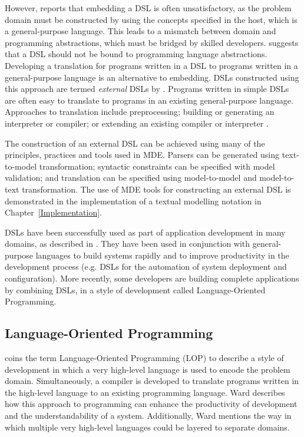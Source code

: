 However, \cite{dmitriev04lop} reports that embedding a DSL is often unsatisfactory, as the problem domain must be constructed by using the concepts specified in the host, which is a general-purpose language. This leads to a mismatch between domain and programming abstractions, which must be bridged by skilled developers. \cite{dmitriev04lop} suggests that a DSL should not be bound to programming language abstractions. Developing a translation for programs written in a DSL to programs written in a general-purpose language is an alternative to embedding. DSLs constructed using this approach are termed \emph{external} DSLs by \cite{fowler10dsls}. Programs written in simple DSLs are often easy to translate to programs in an existing general-purpose language. Approaches to translation include preprocessing; building or generating an interpreter or compiler; or extending an existing compiler or interpreter \cite{dmitriev04lop}.

The construction of an external DSL can be achieved using many of the principles, practices and tools used in MDE. Parsers can be generated using text-to-model transformation; syntactic constraints can be specified with model validation; and translation can be specified using model-to-model and model-to-text transformation. The use of MDE tools for constructing an external DSL is demonstrated in the implementation of a textual modelling notation in Chapter~\ref{Implementation}.

DSLs have been successfully used as part of application development in many domains, as described in \cite{deursen00dslbib}. They have been used in conjunction with general-purpose languages to build systems rapidly and to improve productivity in the development process (e.g. DSLs for the automation of system deployment and configuration). More recently, some developers are building complete applications by combining DSLs, in a style of development called Language-Oriented Programming. 

\subsection{Language-Oriented Programming}
\cite{ward94lop} coins the term Language-Oriented Programming (LOP) to describe a style of development in which a very high-level language is used to encode the problem domain. Simultaneously, a compiler is developed to translate programs written in the high-level language to an existing programming language. Ward describes how this approach to programming can enhance the productivity of development and the understandability of a system. Additionally, Ward mentions the way in which multiple very high-level languages could be layered to separate domains.

